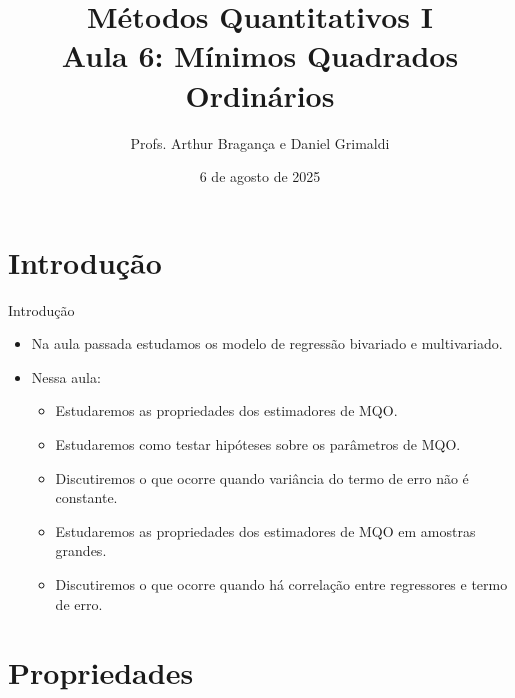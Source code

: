 \documentclass[10pt,slides,xcolor=pdftex,dvipsnames,table]{beamer}
\title{
     Métodos Quantitativos I \\\vspace{6pt}
     Aula 6: Mínimos Quadrados Ordinários \\
    }
\author{Profs. Arthur Bragança e Daniel Grimaldi}
\institute{MPAM-ENAP}
\date{6 de agosto de 2025}
\begin{document}
    \begin{frame}[plain]
        \titlepage
    \end{frame}

    \begin{frame}[plain]
        \tableofcontents
    \end{frame}
    

\section{Introdução}


\begin{frame}{Introdução}

\begin{itemize}\itemsep1.2em

    \item Na aula passada estudamos os modelo de regressão bivariado e multivariado.
	
	\item Nessa aula:
	
	\begin{itemize}
	\item Estudaremos as propriedades dos estimadores de MQO.
	\item Estudaremos como testar hipóteses sobre os parâmetros de MQO.
	\item Discutiremos o que ocorre quando variância do termo de erro não é constante.
	\item Estudaremos as propriedades dos estimadores de MQO em amostras grandes.
	\item Discutiremos o que ocorre quando há correlação entre regressores e termo de erro.
	\end{itemize}

\end{itemize}

\end{frame}


\section{Propriedades}
\end{document}
